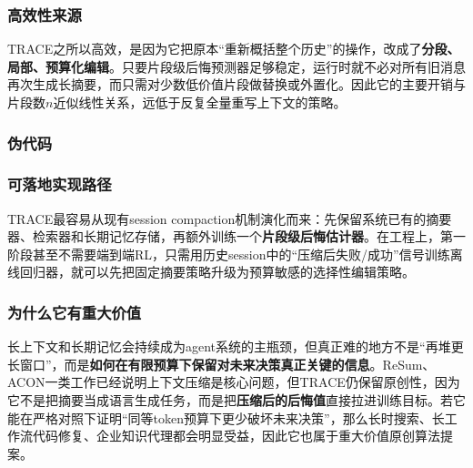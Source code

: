 \documentclass[12pt,a4paper]{article}
\newenvironment{algorithmic}[1][]%
      {\begin{list}{}{\leftmargin=2em\itemsep=0.2em\parsep=0pt\topsep=0.2em}}%
      {\end{list}}
\newcommand{\STATE}{\item[]}
\newcommand{\FOR}[1]{\item[]\textbf{for} ##1 \textbf{do}}
\newcommand{\ENDFOR}{\item[]\textbf{end for}}
\newcommand{\REQUIRE}{\item[]\textbf{Input: }}
\newcommand{\RETURN}{\item[]\textbf{return} }
\begin{document}
\subsubsection{高效性来源}

TRACE之所以高效，是因为它把原本“重新概括整个历史”的操作，改成了\textbf{分段、局部、预算化编辑}。只要片段级后悔预测器足够稳定，运行时就不必对所有旧消息再次生成长摘要，而只需对少数低价值片段做替换或外置化。因此它的主要开销与片段数$n$近似线性关系，远低于反复全量重写上下文的策略。

\subsubsection{伪代码}


\subsubsection{可落地实现路径}

TRACE最容易从现有session compaction机制演化而来：先保留系统已有的摘要器、检索器和长期记忆存储，再额外训练一个\textbf{片段级后悔估计器}。在工程上，第一阶段甚至不需要端到端RL，只需用历史session中的“压缩后失败/成功”信号训练离线回归器，就可以先把固定摘要策略升级为预算敏感的选择性编辑策略。

\subsubsection{为什么它有重大价值}

长上下文和长期记忆会持续成为agent系统的主瓶颈，但真正难的地方不是“再堆更长窗口”，而是\textbf{如何在有限预算下保留对未来决策真正关键的信息}。ReSum、ACON一类工作已经说明上下文压缩是核心问题，但TRACE仍保留原创性，因为它不是把摘要当成语言生成任务，而是把\textbf{压缩后的后悔值}直接拉进训练目标。若它能在严格对照下证明“同等token预算下更少破坏未来决策”，那么长时搜索、长工作流代码修复、企业知识代理都会明显受益，因此它也属于重大价值原创算法提案。
\end{document}
